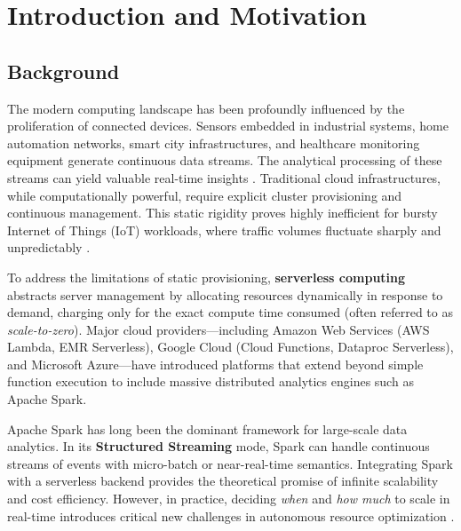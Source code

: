 \chapter{Introduction and Motivation}
\label{chap:intro}

\section{Background}

The modern computing landscape has been profoundly influenced by the proliferation of 
connected devices. Sensors embedded in industrial systems, home automation networks, 
smart city infrastructures, and healthcare monitoring equipment generate continuous 
data streams. The analytical processing of these streams can yield valuable real-time 
insights \cite{hendrickson2020serverless}. Traditional cloud infrastructures, while 
computationally powerful, require explicit cluster provisioning and continuous management. 
This static rigidity proves highly inefficient for bursty Internet of Things (IoT) workloads, 
where traffic volumes fluctuate sharply and unpredictably \cite{shahrad2020serverless}.

To address the limitations of static provisioning, \textbf{serverless computing} abstracts 
server management by allocating resources dynamically in response to demand, charging 
only for the exact compute time consumed (often referred to as \textit{scale-to-zero}). 
Major cloud providers---including Amazon Web Services (AWS Lambda, EMR Serverless), 
Google Cloud (Cloud Functions, Dataproc Serverless), and Microsoft Azure---have introduced 
platforms that extend beyond simple function execution to include massive distributed 
analytics engines such as Apache Spark.

Apache Spark has long been the dominant framework for large-scale data analytics. In its 
\textbf{Structured Streaming} mode, Spark can handle continuous streams of events with 
micro-batch or near-real-time semantics. Integrating Spark with a serverless backend provides 
the theoretical promise of infinite scalability and cost efficiency. However, in practice, 
deciding \textit{when} and \textit{how much} to scale in real-time introduces critical 
new challenges in autonomous resource optimization \cite{werner2024reference, pu2019shuffling}.

